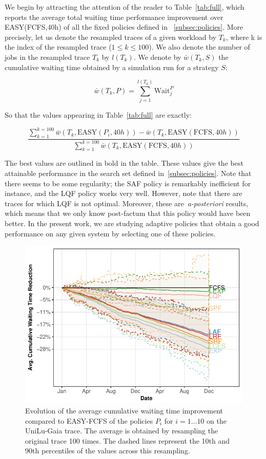\documentclass[sigconf,review,anonymous]{acmart}
\begin{document}
We begin by attracting the attention of the reader to Table~\ref{tab:full},
which reports the average total waiting time performance improvement over
EASY(FCFS,40h) of all the fixed policies defined in ~\ref{subsec:policies}. More
precisely, let us denote the resampled traces of a given workload by $T_k$,
where k is the index of the resampled trace ($1 \le k \le 100$). We also denote
the number of jobs in the resampled trace $T_k$ by $l(T_k)$. We denote by
$\bar{w}(T_k,S)$ the cumulative waiting time obtained by a simulation run for a
strategy $S$:

\begin{equation}
  \bar{w}(T_k,P) = \sum_{j=1}^{l(T_k)} \text{Wait}_j^{P}
\end{equation}

So that the values appearing in Table~\ref{tab:full} are exactly:

\begin{equation}
  \frac{\sum_{k=1}^{k=100}\bar{w}(T_k,\text{EASY}(P_i,40h))-
  \bar{w}(T_k,\text{EASY}(\text{FCFS},40h))}{\sum_{k=1}^{k=100}\bar{w}(T_k,\text{EASY}(\text{FCFS},40h))}
\end{equation}

The best values are outlined in bold in the table. These values give the best
attainable performance in the search set defined in~\ref{subsec:policies}.
Note that there seems to be some regularity; the SAF policy is remarkably
inefficient for instance, and the LQF policy works very well. However, note
that there are traces for which LQF is not optimal. Moreover, these
are~\textit{a-posteriori} results, which means that we only know post-factum
that this policy would have been better. In the present work, we are
studying adaptive policies that obtain a good performance on any given system
by selecting one of these policies.

\begin{figure}[]
  \centering
  \includegraphics[scale=0.6]{figures/full-ANL-Intr.pdf}
  \caption{Evolution of the average cumulative waiting time improvement
    compared to EASY-FCFS of the policies $P_i$ for $i = 1 \ldots 10$ on the
    UniLu-Gaia trace. The average is obtained by resampling the original trace
    100 times. The dashed lines represent the 10th and 90th percentiles of the
  values across this resampling.}
  \label{fig:all}
\end{figure}
\end{document}
